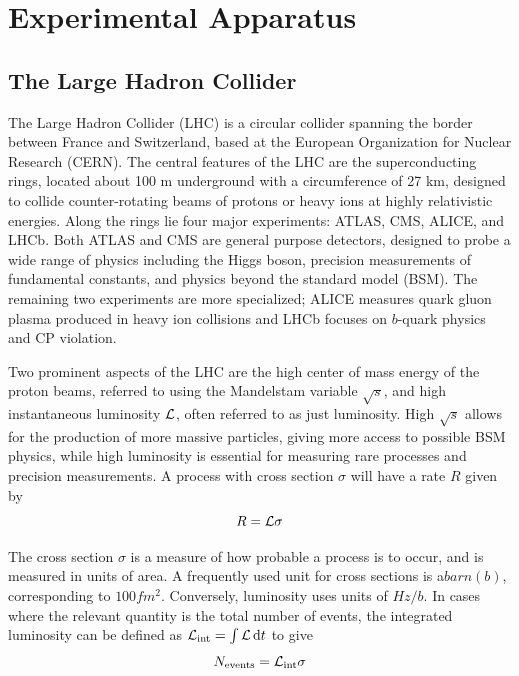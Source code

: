 
\chapter{Experimental Apparatus}
\label{chap:exp}

\section{The Large Hadron Collider} \label{sec:LHC}
The Large Hadron Collider (LHC) is a circular collider spanning the border between France and Switzerland, based at the European Organization for Nuclear Research (CERN). The central features of the LHC are the superconducting rings, located about 100 m underground with a circumference of 27 km, designed to collide counter-rotating beams of protons or heavy ions at highly relativistic energies. Along the rings lie four major experiments: ATLAS, CMS, ALICE, and LHCb. Both ATLAS and CMS are general purpose detectors, designed to probe a wide range of physics including the Higgs boson, precision measurements of fundamental constants, and physics beyond the standard model (BSM). The remaining two experiments are more specialized; ALICE measures quark gluon plasma produced in heavy ion collisions and LHCb focuses on $b$-quark physics and CP violation.

Two prominent aspects of the LHC are the high center of mass energy of the proton beams, referred to using the Mandelstam variable $\sqrt{s}$, and high instantaneous luminosity $\mathcal{L}$, often referred to as just luminosity. High $\sqrt{s}$ allows for the production of more massive particles, giving more access to possible BSM physics, while high luminosity is essential for measuring rare processes and precision measurements. A process with cross section $\sigma$ will have a rate $R$ given by
\begin{equation}
	R=\mathcal{L}\sigma
\end{equation}

The cross section $\sigma$ is a measure of how probable a process is to occur, and is measured in units of area. A frequently used unit for cross sections is a$\unit{barn}\unit{(b)}$, corresponding to $100\unit{fm^2}$. Conversely, luminosity uses units of $\unit{Hz/b}$. In cases where the relevant quantity is the total number of events, the integrated luminosity can be defined as $\intlumi=\int{\lumi\dd{t}}$ to give
\begin{equation}
	N_\mathrm{events} = \mathcal{L}_\mathrm{int}\sigma
\end{equation}

